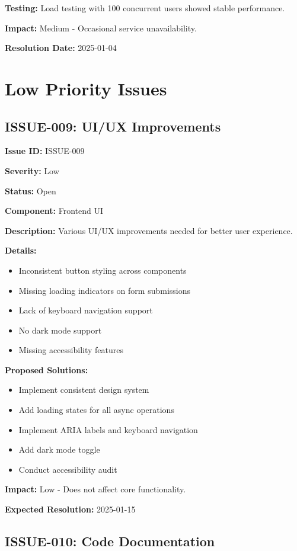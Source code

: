 \documentclass[12pt,a4paper]{article}
\begin{document}
\textbf{Testing:} Load testing with 100 concurrent users showed stable performance.

\textbf{Impact:} Medium - Occasional service unavailability.

\textbf{Resolution Date:} 2025-01-04

\section{Low Priority Issues}

\subsection{ISSUE-009: UI/UX Improvements}

\textbf{Issue ID:} ISSUE-009

\textbf{Severity:} Low

\textbf{Status:} Open

\textbf{Component:} Frontend UI

\textbf{Description:} Various UI/UX improvements needed for better user experience.

\textbf{Details:}
\begin{itemize}
    \item Inconsistent button styling across components
    \item Missing loading indicators on form submissions
    \item Lack of keyboard navigation support
    \item No dark mode support
    \item Missing accessibility features
\end{itemize}

\textbf{Proposed Solutions:}
\begin{itemize}
    \item Implement consistent design system
    \item Add loading states for all async operations
    \item Implement ARIA labels and keyboard navigation
    \item Add dark mode toggle
    \item Conduct accessibility audit
\end{itemize}

\textbf{Impact:} Low - Does not affect core functionality.

\textbf{Expected Resolution:} 2025-01-15

\subsection{ISSUE-010: Code Documentation}
\end{document}
